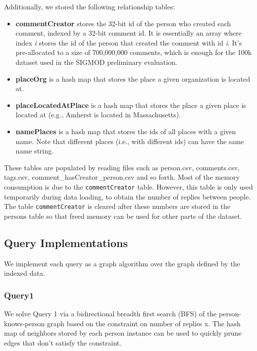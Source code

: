 \documentclass{article}
\begin{document}
Additionally, we stored the following relationship tables: 

\begin{itemize}
\item \textbf{commentCreator} stores the 32-bit id of the person who created each comment, indexed by a 32-bit comment id. It is essentially an array where index \emph{i} stores the id of the person that created the comment with id \emph{i}. It's pre-allocated to a size of 700,000,000 comments, which is enough for the 100k dataset used in the SIGMOD preliminary evaluation. 
\item \textbf{placeOrg} is a hash map that stores the place a given organization is located at.  
\item \textbf{placeLocatedAtPlace} is a hash map that stores the place a given place is located at (e.g., Amherst is located in Massachusetts).  
\item \textbf{namePlaces} is a hash map that stores the ids of all places with a given name. Note that different places (i.e., with different ids) can have the same name string.
\end{itemize}

These tables are populated by reading files such as person.csv,
comments.csv, tags.csv, comment\_hasCreator\_person.csv and so forth.
Most of the memory consumption is due to the \texttt{commentCreator}
table.  However, this table is only used temporarily during data
loading, to obtain the number of replies between people. The table
\texttt{commentCreator} is cleared after these numbers are stored in
the persons table so that freed memory can be used for other parts of
the dataset.

\subsection{Query Implementations}

We implement each query as a graph algorithm over the graph defined by
the indexed data.

\subsubsection{Query1}
We solve Query 1 via a bidirectional breadth first search (BFS) of the
person-knows-person graph based on the constraint on number of replies
x.  The hash map of neighbors stored by each person instance can be used
to quickly prune edges that don't satisfy the constraint. 
\end{document}
